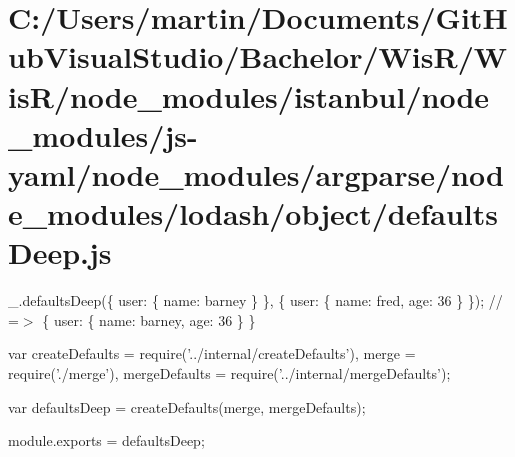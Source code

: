 \hypertarget{_c_1_2_users_2martin_2_documents_2_git_hub_visual_studio_2_bachelor_2_wis_r_2_wis_r_2node_module94bf64cfd31e0f2b8303f6685d276031}{}\section{C\+:/\+Users/martin/\+Documents/\+Git\+Hub\+Visual\+Studio/\+Bachelor/\+Wis\+R/\+Wis\+R/node\+\_\+modules/istanbul/node\+\_\+modules/js-\/yaml/node\+\_\+modules/argparse/node\+\_\+modules/lodash/object/defaults\+Deep.\+js}
\+\_\+.\+defaults\+Deep(\{ \textquotesingle{}user\textquotesingle{}\+: \{ \textquotesingle{}name\textquotesingle{}\+: \textquotesingle{}barney\textquotesingle{} \} \}, \{ \textquotesingle{}user\textquotesingle{}\+: \{ \textquotesingle{}name\textquotesingle{}\+: \textquotesingle{}fred\textquotesingle{}, \textquotesingle{}age\textquotesingle{}\+: 36 \} \}); // =$>$ \{ \textquotesingle{}user\textquotesingle{}\+: \{ \textquotesingle{}name\textquotesingle{}\+: \textquotesingle{}barney\textquotesingle{}, \textquotesingle{}age\textquotesingle{}\+: 36 \} \}


\begin{DoxyCodeInclude}
var createDefaults = require(\textcolor{stringliteral}{'../internal/createDefaults'}),
    merge = require(\textcolor{stringliteral}{'./merge'}),
    mergeDefaults = require(\textcolor{stringliteral}{'../internal/mergeDefaults'});

var defaultsDeep = createDefaults(merge, mergeDefaults);

module.exports = defaultsDeep;
\end{DoxyCodeInclude}
 